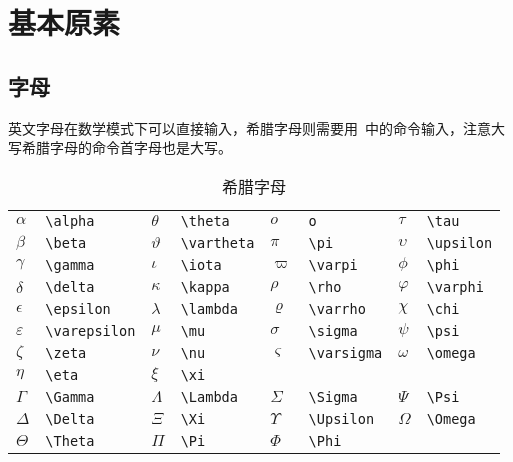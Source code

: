\section{基本原素}
\subsection{字母}

英文字母在数学模式下可以直接输入，希腊字母则需要用~中的命令输入，注意大写希腊字母的命令首字母也是大写。

\begin{table}[htbp]
\caption{希腊字母}
\label{tab:greek}
\centering
\begin{tabular}{llllllll}
    \toprule
    $\alpha$      & \verb|\alpha|      & $\theta$    & \verb|\theta|    & 
        $o$         & \verb|o|        & $\tau$     & \verb|\tau| \\
    $\beta$       & \verb|\beta|       & $\vartheta$ & \verb|\vartheta| & 
        $\pi$       & \verb|\pi|      & $\upsilon$ & \verb|\upsilon| \\
    $\gamma$      & \verb|\gamma|      & $\iota$     & \verb|\iota|     & 
        $\varpi$    & \verb|\varpi|   & $\phi$     & \verb|\phi| \\
    $\delta$      & \verb|\delta|      & $\kappa$    & \verb|\kappa|    & 
        $\rho$      & \verb|\rho|     & $\varphi$  & \verb|\varphi| \\
    $\epsilon$    & \verb|\epsilon|    & $\lambda$   & \verb|\lambda|   & 
        $\varrho$   & \verb|\varrho|  & $\chi$     & \verb|\chi| \\
    $\varepsilon$ & \verb|\varepsilon| & $\mu$       & \verb|\mu|       & 
        $\sigma$    & \verb|\sigma|   & $\psi$     & \verb|\psi| \\
    $\zeta$       & \verb|\zeta|       & $\nu$       & \verb|\nu|       & 
        $\varsigma$ & \verb|\varsigma|   & $\omega$   & \verb|\omega| \\
    $\eta$        & \verb|\eta|        & $\xi$       & \verb|\xi|       & 
        &                 &            & \\
    $\Gamma$      & \verb|\Gamma|      & $\Lambda$   & \verb|\Lambda|   & 
        $\Sigma$    & \verb|\Sigma|   & $\Psi$     & \verb|\Psi| \\
    $\Delta$      & \verb|\Delta|      & $\Xi$       & \verb|\Xi|       & 
        $\Upsilon$  & \verb|\Upsilon| & $\Omega$   & \verb|\Omega| \\
    $\Theta$      & \verb|\Theta|      & $\Pi$       & \verb|\Pi|       & 
        $\Phi$      & \verb|\Phi|     &            & \\
    \bottomrule
\end{tabular}
\end{table}

